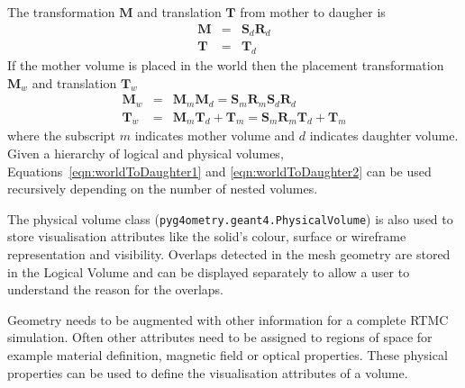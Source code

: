\documentclass[final,5p,times,twocolumn]{elsarticle}
\newcommand{\pyinline}[1]{\lstinline[postbreak={}]{#1}}
\begin{document}
The transformation  $\mathbf{M}$  and translation $\mathbf{T}$ from mother to daugher is 
\begin{eqnarray}
\mathbf{M} 	& = &  \mathbf{S}_d  \mathbf{R}_d \\
\mathbf{T} 	& = &  \mathbf{T}_d
\end{eqnarray}
%
If the mother volume is placed in the world then the placement transformation $\mathbf{M}_w$ and translation $\mathbf{T}_w$ 
\begin{eqnarray}
\mathbf{M}_w	  	& = & \mathbf{M}_m \mathbf{M}_d  = \mathbf{S}_m \mathbf{R}_m  \mathbf{S}_d \mathbf{R}_d				\label{eqn:worldToDaughter1}\\
\mathbf{T}	_w 		& = & \mathbf{M}_m \mathbf{T}_d + \mathbf{T}_m= \mathbf{S}_m \mathbf{R}_m \mathbf{T}_d + \mathbf{T}_m  \label{eqn:worldToDaughter2}
\end{eqnarray}
where the subscript $m$ indicates mother volume and $d$ indicates daughter volume. Given a hierarchy of logical and physical volumes, 
Equations~\ref{eqn:worldToDaughter1} and \ref{eqn:worldToDaughter2} can be used recursively depending on the number of nested volumes.

The physical volume class (\pyinline{pyg4ometry.geant4.PhysicalVolume}) is also used to store visualisation attributes like the solid's 
colour, surface or wireframe representation and visibility. Overlaps detected in the mesh geometry are
stored in the Logical Volume and can be  displayed separately to allow a user to understand the reason for 
the overlaps.   

Geometry needs to be augmented with other information for a complete RTMC simulation. Often other attributes need to be 
assigned to regions of space for example material definition, magnetic field or optical properties. These physical properties 
can be used to define the visualisation attributes of a volume. 
\end{document}
